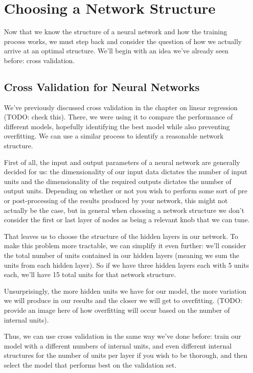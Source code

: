\section{Choosing a Network Structure}
Now that we know the structure of a neural network and how the training process works, we must step back and consider the question of how we actually arrive at an optimal structure. We'll begin with an idea we've already seen before: cross validation.

\subsection{Cross Validation for Neural Networks}
We've previously discussed cross validation in the chapter on linear regression (TODO: check this). There, we were using it to compare the performance of different models, hopefully identifying the best model while also preventing overfitting. We can use a similar process to identify a reasonable network structure.

First of all, the input and output parameters of a neural network are generally decided for us: the dimensionality of our input data dictates the number of input units and the dimensionality of the required outputs dictates the number of output units. Depending on whether or not you wish to perform some sort of pre or post-processing of the results produced by your network, this might not actually be the case, but in general when choosing a network structure we don't consider the first or last layer of nodes as being a relevant knob that we can tune.

That leaves us to choose the structure of the hidden layers in our network. To make this problem more tractable, we can simplify it even further: we'll consider the total number of units contained in our hidden layers (meaning we sum the units from each hidden layer). So if we have three hidden layers each with 5 units each, we'll have 15 total units for that network structure.

Unsurprisingly, the more hidden units we have for our model, the more variation we will produce in our results and the closer we will get to overfitting. (TODO: provide an image here of how overfitting will occur based on the number of internal units).

Thus, we can use cross validation in the same way we've done before: train our model with a different numbers of internal units, and even different internal structures for the number of units per layer if you wish to be thorough, and then select the model that performs best on the validation set.

